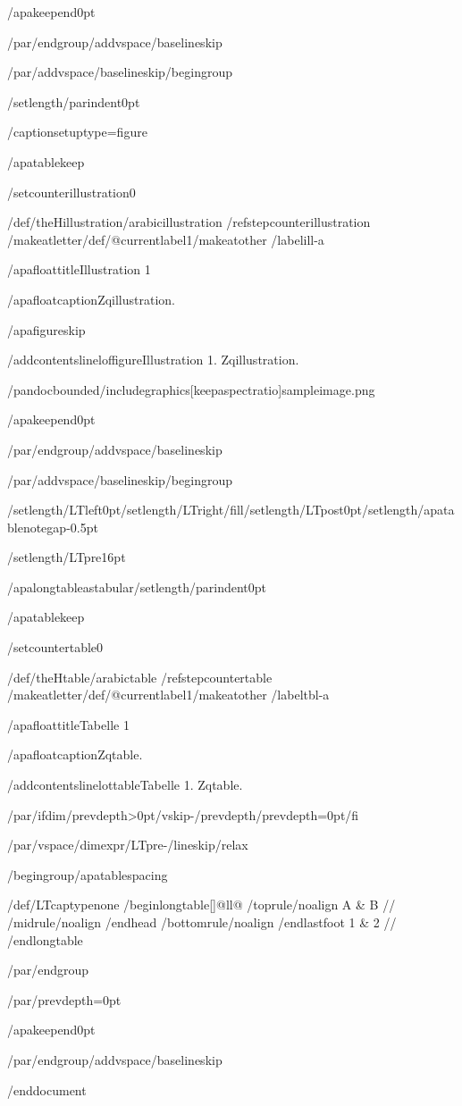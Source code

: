 /apakeepend{0pt}

/par/endgroup/addvspace{/baselineskip}

/par/addvspace{/baselineskip}/begingroup

/setlength{/parindent}{0pt}

/captionsetup{type=figure}

/apatablekeep

/setcounter{illustration}{0}

/def/theHillustration{/arabic{illustration}}%
/refstepcounter{illustration}%
/makeatletter/def/@currentlabel{1}/makeatother%
/label{ill-a}

/apafloattitle{Illustration 1}

/apafloatcaption{Zqillustration.}

/apafigureskip

/addcontentsline{lof}{figure}{Illustration 1. Zqillustration.}

/pandocbounded{/includegraphics[keepaspectratio]{sampleimage.png}}

/apakeepend{0pt}

/par/endgroup/addvspace{/baselineskip}

/par/addvspace{/baselineskip}/begingroup

/setlength{/LTleft}{0pt}/setlength{/LTright}{/fill}/setlength{/LTpost}{0pt}/setlength{/apatablenotegap}{-0.5pt}

/setlength{/LTpre}{16pt}

/apalongtableastabular/setlength{/parindent}{0pt}

/apatablekeep

/setcounter{table}{0}

/def/theHtable{/arabic{table}}%
/refstepcounter{table}%
/makeatletter/def/@currentlabel{1}/makeatother%
/label{tbl-a}

/apafloattitle{Tabelle 1}

/apafloatcaption{Zqtable.}

/addcontentsline{lot}{table}{Tabelle 1. Zqtable.}

/par/ifdim/prevdepth>0pt/vskip-/prevdepth/prevdepth=0pt/fi

/par/vspace{/dimexpr/LTpre-/lineskip/relax}

/begingroup/apatablespacing

{/def/LTcaptype{none} %
/begin{longtable}[]{@{}ll@{}}
/toprule/noalign{}
A & B //
/midrule/noalign{}
/endhead
/bottomrule/noalign{}
/endlastfoot
1 & 2 //
/end{longtable}
}

/par/endgroup

/par/prevdepth=0pt

/apakeepend{0pt}

/par/endgroup/addvspace{/baselineskip}




/end{document}

